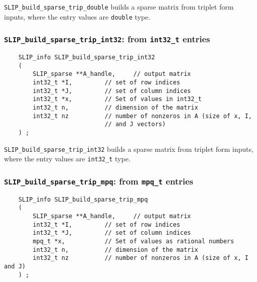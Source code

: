 \documentclass[12pt]{article}
\theoremstyle{definition}
\begin{document}
\verb|SLIP_build_sparse_trip_double| builds a sparse matrix from triplet form
inputs, where the entry values are \verb|double| type.

\cprotect\subsubsection{\verb|SLIP_build_sparse_trip_int32|:
from \verb|int32_t| entries}
\label{s:user:build_sparse_trip_int32}

\begin{mdframed}[userdefinedwidth=6in]
{\footnotesize
\begin{verbatim}
    SLIP_info SLIP_build_sparse_trip_int32
    (
        SLIP_sparse **A_handle,     // output matrix
        int32_t *I,         // set of row indices
        int32_t *J,         // set of column indices
        int32_t *x,         // Set of values in int32_t
        int32_t n,          // dimension of the matrix
        int32_t nz          // number of nonzeros in A (size of x, I,
                            // and J vectors)
    ) ;
\end{verbatim}
} \end{mdframed}

\verb|SLIP_build_sparse_trip_int32| builds a sparse matrix from triplet form
inputs, where the entry values are \verb|int32_t| type.

\cprotect\subsubsection{\verb|SLIP_build_sparse_trip_mpq|:
from \verb|mpq_t| entries}
\label{s:user:build_sparse_trip_mpq}

\begin{mdframed}[userdefinedwidth=6in]
{\footnotesize
\begin{verbatim}
    SLIP_info SLIP_build_sparse_trip_mpq
    (
        SLIP_sparse **A_handle,     // output matrix
        int32_t *I,         // set of row indices
        int32_t *J,         // set of column indices
        mpq_t *x,           // Set of values as rational numbers
        int32_t n,          // dimension of the matrix
        int32_t nz          // number of nonzeros in A (size of x, I and J)
    ) ;
\end{verbatim}
} \end{mdframed}
\end{document}
